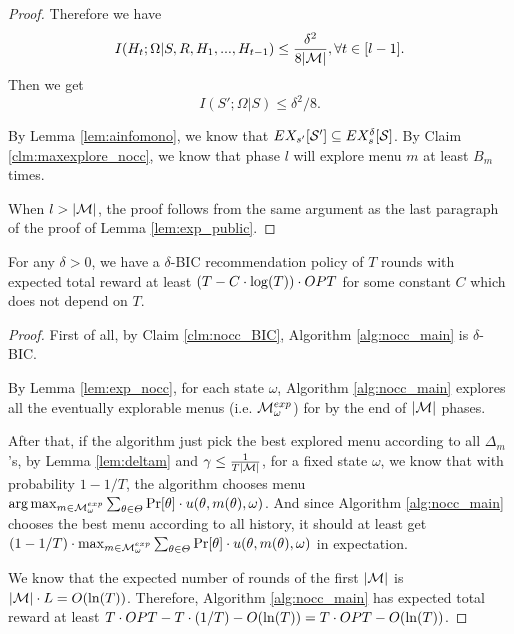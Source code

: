 \begin{proof}
Therefore we have
\[
I(H_t; \Omega|S,R,H_1,...,H_{t-1}) \leq \frac{\delta^2}{8|\mathcal{M}|}, \forall t \in [l-1].
\]
Then we get 
\[
I(S'; \Omega | S) \leq \delta^2/8.
\]

By Lemma \ref{lem:ainfomono}, we know that $EX_{s'}[\mathcal{S}'] \subseteq EX^{\delta}_s[\mathcal{S}]$. By Claim \ref{clm:maxexplore_nocc}, we know that phase $l$ will explore menu $m$ at least $B_m$ times.

When $l > |\mathcal{M}|$, the proof follows from the same argument as the last paragraph of the proof of Lemma \ref{lem:exp_public}.
\end{proof}

\begin{corollary}
\label{cor:private_nocc}
For any $\delta > 0$, we have a $\delta$-BIC recommendation policy of $T$ rounds with expected total reward at least $\left(T - C\cdot \log(T) \right) \cdot OPT$ for some constant $C$ which does not depend on $T$. 
\end{corollary}

\begin{proof}

First of all, by Claim \ref{clm:nocc_BIC}, Algorithm \ref{alg:nocc_main} is $\delta$-BIC. 

By Lemma \ref{lem:exp_nocc}, for each state $\omega$, Algorithm \ref{alg:nocc_main} explores all the eventually explorable menus (i.e. $\mathcal{M}_{\omega}^{exp}$) for by the end of $|\mathcal{M}|$ phases. 

After that, if the algorithm just pick the best explored menu according to all $\Delta_m$'s, by Lemma \ref{lem:deltam} and $\gamma \leq \frac{1}{T|\mathcal{M}|}$, for a fixed state $\omega$, we know that with probability $1- 1/T$, the algorithm chooses menu $\arg\max_{m \in \mathcal{M}_{\omega}^{exp}} \sum_{\theta \in \varTheta} \Pr[\theta] \cdot u(\theta, m(\theta), \omega)$. And since Algorithm \ref{alg:nocc_main} chooses the best menu according to all history, it should at least get $(1-1/T) \cdot \max_{m \in \mathcal{M}_{\omega}^{exp}} \sum_{\theta \in \varTheta} \Pr[\theta] \cdot u(\theta, m(\theta), \omega)$ in expectation.

We know that the expected number of rounds of the first  $|\mathcal{M}|$ is $|\mathcal{M}| \cdot L = O(\ln(T))$. Therefore, Algorithm \ref{alg:nocc_main} has expected total reward at least $T \cdot OPT- T \cdot (1/T) - O(\ln(T)) = T\cdot OPT - O(\ln(T))$.

\end{proof}

